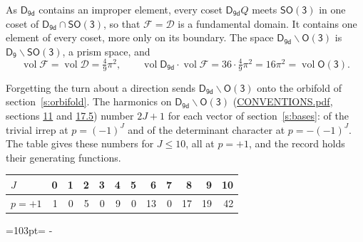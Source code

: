 \documentclass[10pt,a4paper]{article}
\newcommand{\needspace}[1]{\par\penalty-100\begingroup\dimen0=#1\relax\dimen2=\pagegoal
  \advance\dimen2-\pagetotal\ifdim\dimen0>\dimen2\relax\ifdim\dimen2>0pt\vfil\break\fi\fi
  \endgroup}
\numberwithin{equation}{section}
\newcommand{\grp}[1]{\mathsf{#1}}
\newcommand{\vol}{\operatorname{vol}}
\newcommand{\fcell}{\mathcal{D}}
\newcommand{\fdomain}{\mathcal{F}}
\begin{document}
\leavevmode\label{n:set.fundamental}As $\grp{D_{9d}}$ contains an improper element, every coset $\grp{D_{9d}}Q$ meets \href{SO3.pdf}{$\grp{SO(3)}$} in one coset of $\grp{D_{9d}} \cap \grp{SO(3)}$, so that $\fdomain = \fcell$ is a fundamental domain. It contains one element of every coset, more only on its boundary.
The space $\grp{D_{9d}}\backslash\grp{O(3)}$ is $\grp{D_{9}}\backslash\grp{SO(3)}$, a prism space, and
\begin{equation}\label{e:volume}\vol\fdomain = \vol\fcell = \tfrac{4}{9}\pi^2,\qquad \vol\grp{D_{9d}}\cdot\vol\fdomain = 36\cdot \tfrac{4}{9}\pi^2 = 16\pi^2 = \vol\grp{O(3)}.\end{equation}

Forgetting the turn about a direction sends $\grp{D_{9d}}\backslash\grp{O(3)}$ onto the orbifold of section~\ref{s:orbifold}.
The harmonics on $\grp{D_{9d}}\backslash\grp{O(3)}$ (\href{../../CONVENTIONS.pdf}{CONVENTIONS.pdf}, sections \href{../../CONVENTIONS.pdf\#conv.11}{11} and \href{../../CONVENTIONS.pdf\#conv.17.5}{17.5}) number $2J + 1$ for each vector of section~\ref{s:bases}: of the trivial irrep at $p = (-1)^J$ and of the determinant character at $p = -(-1)^J$. The table gives these numbers for $J \le 10$, all at $p = +1$, and the record holds their generating functions.
{\small\setlength{\tabcolsep}{4pt}\begin{longtable}{@{}lrrrrrrrrrrr@{}}\toprule
$J$ & 0 & 1 & 2 & 3 & 4 & 5 & 6 & 7 & 8 & 9 & 10\\\midrule\endhead
\bottomrule\endfoot\endlastfoot
$p = +1$ & 1 & 0 & 5 & 0 & 9 & 0 & 13 & 0 & 17 & 19 & 42\\
\bottomrule\end{longtable}}
\needspace{103pt}
\end{document}
